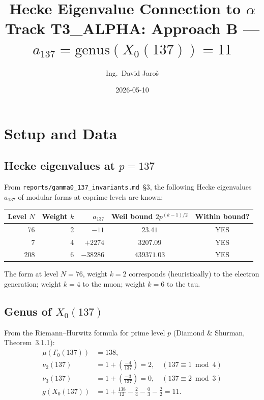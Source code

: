 \documentclass[12pt,a4paper]{article}
\title{\textbf{Hecke Eigenvalue Connection to $\alpha$}\\[4pt]
         \large Track T3\_ALPHA: Approach B --- $a_{137} = \mathrm{genus}(X_0(137)) = 11$}
\author{Ing.\ David Jaro\v{s}}
\date{2026-05-10}
\theoremstyle{definition}
\theoremstyle{remark}
\begin{document}
  \maketitle
\fi

\section{Setup and Data}
\label{sec:hecke:setup}

\subsection{Hecke eigenvalues at $p = 137$}

From \texttt{reports/gamma0\_137\_invariants.md}~\S{}3, the following Hecke
eigenvalues $a_{137}$ of modular forms at coprime levels are known:

\begin{center}
\begin{tabular}{rrrcc}
  \toprule
  Level $N$ & Weight $k$ & $a_{137}$ & Weil bound $2p^{(k-1)/2}$ & Within bound? \\
  \midrule
  76  & 2 & $-11$ & $23.41$ & YES \\
  7   & 4 & $+2274$ & $3207.09$ & YES \\
  208 & 6 & $-38286$ & $439371.03$ & YES \\
  \bottomrule
\end{tabular}
\end{center}

\noindent The form at level $N=76$, weight $k=2$ corresponds (heuristically) to the
electron generation; weight $k=4$ to the muon; weight $k=6$ to the tau.

\subsection{Genus of $X_0(137)$}

From the Riemann--Hurwitz formula for prime level $p$
(Diamond \& Shurman, Theorem~3.1.1):
\begin{align}
  \mu(\Gamma_0(137)) &= 138 ,\\
  \nu_2(137) &= 1 + \left(\tfrac{-4}{137}\right) = 2 , \quad (137 \equiv 1 \bmod 4)\\
  \nu_3(137) &= 1 + \left(\tfrac{-3}{137}\right) = 0 , \quad (137 \equiv 2 \bmod 3)\\
  g(X_0(137)) &= 1 + \frac{138}{12} - \frac{2}{4} - \frac{0}{3} - \frac{2}{2} = 11 .
  \label{eq:genus137}
\end{align}
\end{document}
